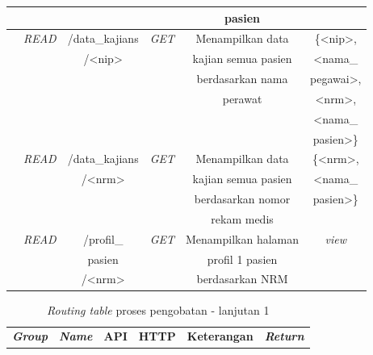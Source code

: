 \begin{enumerate}
\begin{table}[H]
\begin{tabular}{|c|c|c|c|c|c|}
			& 
			&
			&
			&
			pasien &\\
			\hline
			
			& 
			\emph{READ} &
			/data\_kajians&
			\emph{GET} &
			Menampilkan data &
			\{<nip>,\\
			
			
			& 
			&
			/<nip>&
			&
			kajian semua pasien &
			<nama\_\\
			
			& 
			&
			&
			&
			berdasarkan nama &
			pegawai>,\\
			
			& 
			&
			&
			&
			perawat &
			<nrm>,\\
			
			& 
			&
			&
			&
			&
			<nama\_\\
			
			& 
			&
			&
			&
			&
			pasien>\}\\
			\hline
			
			& 
			\emph{READ} &
			/data\_kajians&
			\emph{GET} &
			Menampilkan data &
			\{<nrm>,\\
			
			
			& 
			&
			/<nrm>&
			&
			kajian semua pasien&
			<nama\_\\
			
			& 
			&
			&
			&
			berdasarkan nomor &
			pasien>\}\\
			
			& 
			&
			&
			&
			rekam medis &
			\\
			\hline
			
			& 
			\emph{READ} &
			/profil\_&
			\emph{GET} &
			Menampilkan halaman &
			\emph{view}\\
			
			
			& 
			&
			pasien&
			&
			profil 1 pasien &
			\\
			
			& 
			&
			/<nrm>&
			&
			berdasarkan NRM &
			\\
			\hline
			
		\end{tabular}
	\end{table}
	
	\begin{table}[H]
		\centering
		\caption{\emph{Routing table} proses pengobatan - lanjutan 1}
		\label{tabel_input}
		\begin{tabular}{|c|c|c|c|c|c|}
			\hline
			\textbf{\emph{Group}} & \textbf{\emph{Name}} & \textbf{API} & \textbf{HTTP} & \textbf{Keterangan} & \textbf{\emph{Return}} \\
			

\end{tabular}
\end{table}
\end{enumerate}
